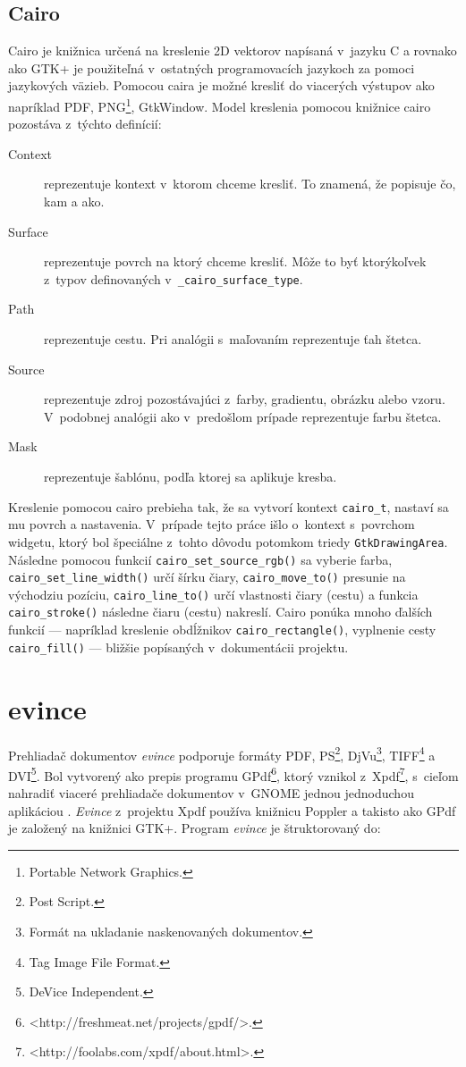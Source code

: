 \documentclass[12pt,oneside,final]{fithesis2}
\begin{document}
\section{Cairo}
Cairo je knižnica určená na kreslenie 2D vektorov napísaná v~jazyku C a rovnako ako GTK+ je použiteľná v~ostatných programovacích jazykoch za pomoci jazykových väzieb. Pomocou caira je možné kresliť do viacerých výstupov ako napríklad PDF, PNG\footnote{Portable Network Graphics.}, GtkWindow. Model kreslenia pomocou knižnice cairo pozostáva z~týchto definícií:
\begin{description}
\item[Context] reprezentuje kontext v~ktorom chceme kresliť. To znamená, že popisuje čo, kam a ako.
\item[Surface] reprezentuje povrch na ktorý chceme kresliť. Môže to byť ktorýkoľvek z~typov definovaných v~\texttt{\_cairo\_surface\_type}.
\item[Path] reprezentuje cestu. Pri analógii s~maľovaním reprezentuje ťah štetca.
\item[Source] reprezentuje zdroj pozostávajúci z~farby, gradientu, obrázku alebo vzoru. V~podobnej analógii ako v~predošlom prípade reprezentuje farbu štetca.
\item[Mask] reprezentuje šablónu, podľa ktorej sa aplikuje kresba.
\end{description}
Kreslenie pomocou cairo prebieha tak, že sa vytvorí kontext \texttt{cairo\_t}, nastaví sa mu povrch a nastavenia. V~prípade tejto práce išlo o~kontext s~povrchom widgetu, ktorý bol špeciálne z~tohto dôvodu potomkom triedy \texttt{GtkDrawingArea}. Následne pomocou funkcií \texttt{cairo\_set\_source\_rgb()} sa vyberie farba, \texttt{cairo\_set\_line\_width()} určí šírku čiary, \texttt{cairo\_move\_to()} presunie na východziu pozíciu, \texttt{cairo\_line\_to()} určí vlastnosti čiary (cestu) a funkcia \texttt{cairo\_stroke()} následne čiaru (cestu) nakreslí. Cairo ponúka mnoho ďalších funkcií --- napríklad kreslenie obdĺžnikov \texttt{cairo\_rectangle()}, vyplnenie cesty \texttt{cairo\_fill()} --- bližšie popísaných v~dokumentácii projektu\cite{cairodoc}.
\chapter{evince}
Prehliadač dokumentov \emph{evince} podporuje formáty PDF, PS\footnote{Post Script.}, DjVu\footnote{Formát na ukladanie naskenovaných dokumentov.}, TIFF\footnote{Tag Image File Format.} a DVI\footnote{DeVice Independent.}. Bol vytvorený ako prepis programu GPdf\footnote{<http://freshmeat.net/projects/gpdf/>.}, ktorý vznikol z~Xpdf\footnote{<http://foolabs.com/xpdf/about.html>.}, s~cieľom nahradiť viaceré prehliadače dokumentov v~GNOME jednou jednoduchou aplikáciou \cite{evince}. \emph{Evince} z~projektu Xpdf používa knižnicu Poppler a takisto ako GPdf je založený na knižnici GTK+. Program \emph{evince} je štruktorovaný do:
\end{document}
